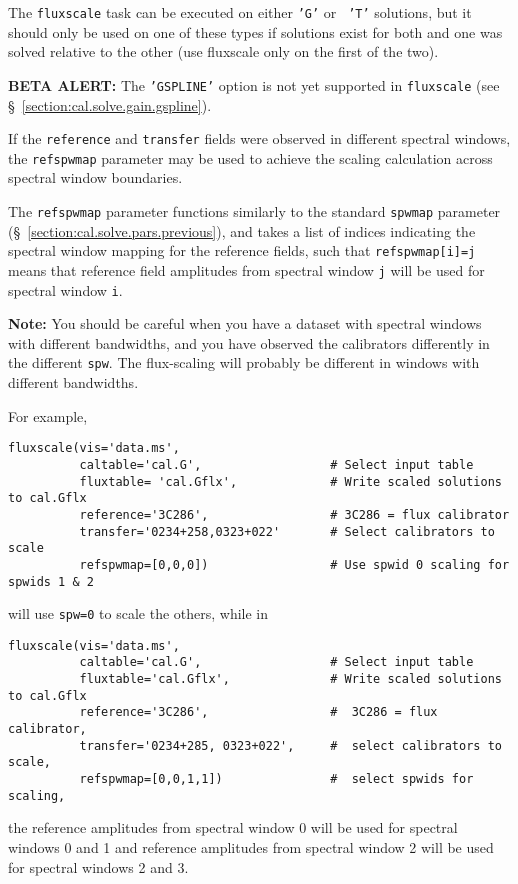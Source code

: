 The {\tt fluxscale} task can be executed on either {\tt 'G'} or {\tt
'T'} solutions, but it should only be used on one of these types if
solutions exist for both and one was solved relative to the other (use
fluxscale only on the first of the two).  

{\bf BETA ALERT:} The {\tt 'GSPLINE'} option is not yet supported in
{\tt fluxscale} (see \S~\ref{section:cal.solve.gain.gspline}).

If the {\tt reference} and {\tt transfer} fields were observed in different
spectral windows, the {\tt refspwmap} parameter may be used
to achieve the scaling calculation across spectral window boundaries.

The {\tt refspwmap} parameter functions similarly to the standard
{\tt spwmap} parameter (\S~\ref{section:cal.solve.pars.previous}),
and takes a list of indices
indicating the spectral window mapping for the reference fields,
such that {\tt refspwmap[i]=j} means that reference field amplitudes
from spectral window {\tt j} will be used for spectral window {\tt i}.

{\bf Note:} You should be careful when you have a dataset with
spectral windows with different bandwidths, and you
have observed the calibrators differently in the different {\tt spw}.
The flux-scaling will probably be different in windows with different
bandwidths.

For example,
\small
\begin{verbatim}
fluxscale(vis='data.ms',
          caltable='cal.G',                  # Select input table
          fluxtable= 'cal.Gflx',             # Write scaled solutions to cal.Gflx
          reference='3C286',                 # 3C286 = flux calibrator
          transfer='0234+258,0323+022'       # Select calibrators to scale
          refspwmap=[0,0,0])                 # Use spwid 0 scaling for spwids 1 & 2
\end{verbatim}
\normalsize
will use {\tt spw=0} to scale the others, while in
\small
\begin{verbatim}
fluxscale(vis='data.ms',
          caltable='cal.G',                  # Select input table
          fluxtable='cal.Gflx',              # Write scaled solutions to cal.Gflx
          reference='3C286',                 #  3C286 = flux calibrator,
          transfer='0234+285, 0323+022',     #  select calibrators to scale,
          refspwmap=[0,0,1,1])               #  select spwids for scaling,
\end{verbatim}
\normalsize
the reference amplitudes from spectral window 0 will be
used for spectral windows 0 and 1 and reference amplitudes from
spectral window 2 will be used for spectral windows 2 and 3.

